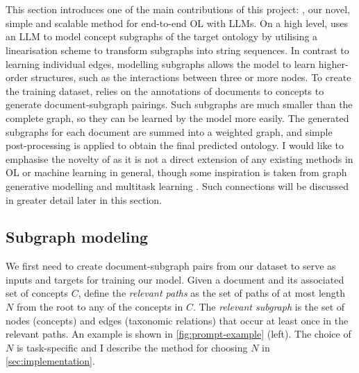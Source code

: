 \section{\name}  \label{sec:implementation:core}

This section introduces one of the main contributions of this project: \name, our novel, simple and scalable method for end-to-end OL with LLMs. On a high level, \name uses an LLM to model concept subgraphs of the target ontology by utilising a linearisation scheme to transform subgraphs into string sequences. In contrast to learning individual edges, modelling subgraphs allows the model to learn higher-order structures, such as the interactions between three or more nodes. To create the training dataset, \name relies on the annotations of documents to concepts to generate document-subgraph pairings. Such subgraphs are much smaller than the complete graph, so they can be learned by the model more easily. The generated subgraphs for each document are summed into a weighted graph, and simple post-processing is applied to obtain the final predicted ontology. I would like to emphasise the novelty of \name as it is not a direct extension of any existing methods in OL or machine learning in general, though some inspiration is taken from graph generative modelling \cite{li2018learning} and multitask learning \cite{caruana1997multitask}. Such connections will be discussed in greater detail later in this section.

\subsection{Subgraph modeling}  \label{sec:method:subgraph}



We first need to create document-subgraph pairs from our dataset to serve as inputs and targets for training our model. Given a document and its associated set of concepts $C$, define the \emph{relevant paths} as the set of paths of at most length $N$ from the root to any of the concepts in $C$. The \emph{relevant subgraph} is the set of nodes (concepts) and edges (taxonomic relations) that occur at least once in the relevant paths. An example is shown in \cref{fig:prompt-example} (left). The choice of $N$ is task-specific and I describe the method for choosing $N$ in \cref{sec:implementation}.

